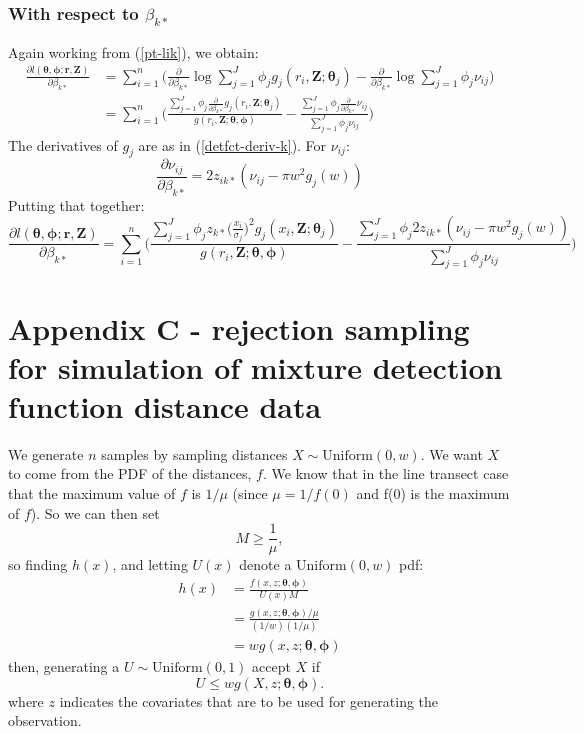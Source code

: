 \documentclass[useAMS,referee, usegraphicx]{biom}
\begin{document}
\subsubsection*{With respect to $\beta_{k*}$}

Again working from (\ref{pt-lik}), we obtain:
\begin{align*}
\frac{\partial l(\bm{\theta}, \bm{\phi}; \mathbf{r},\mathbf{Z})}{\partial \beta_{k*}}  &= \sum_{i=1}^n \Big( \frac{\partial}{\partial \beta_{k*}} \log \sum_{j=1}^J \phi_j g_j(r_i,\mathbf{Z}; \bm{\theta}_j) - \frac{\partial}{\partial \beta_{k*}}\log \sum_{j=1}^J \phi_j \nu_{ij}\Big)\\
&= \sum_{i=1}^n \Big( \frac{ \sum_{j=1}^J \phi_{j} \frac{\partial}{\partial \beta_{k*}}  g_{j} (r_i,\mathbf{Z}; \bm{\theta}_j)}{g(r_i,\mathbf{Z}; \bm{\theta}, \bm{\phi})} - \frac{ \sum_{j=1}^J \phi_{j}\frac{\partial}{\partial \beta_{k*}}  \nu_{ij} }{ \sum_{j=1}^J \phi_j \nu_{ij}}\Big)
\end{align*}
The derivatives of $g_j$ are as in (\ref{detfct-deriv-k}). For $\nu_{ij}$:
\begin{equation*}
\frac{\partial \nu_{ij}}{\partial \beta_{k*}} =  2z_{ik*}(\nu_{ij} - \pi w^2 g_j(w))
\end{equation*}
Putting that together:
\begin{equation*}
\frac{\partial l(\bm{\theta}, \bm{\phi}; \mathbf{r},\mathbf{Z})}{\partial \beta_{k*}}  = \sum_{i=1}^n \Big( \frac{ \sum_{j=1}^J \phi_{j} z_{k*} \Big( \frac{x_i}{\sigma_{j}}\Big)^2 g_j(x_i,\mathbf{Z}; \bm{\theta}_j)}{g(r_i,\mathbf{Z}; \bm{\theta}, \bm{\phi})} - \frac{ \sum_{j=1}^J \phi_{j}2z_{ik*}(\nu_{ij} - \pi w^2 g_j(w)) }{ \sum_{j=1}^J \phi_j \nu_{ij}}\Big)
\end{equation*}

\section*{Appendix C - rejection sampling for simulation of mixture detection function distance data}

We generate $n$ samples by sampling distances $X\sim \text{Uniform}(0,w)$. We want $X$ to come from the PDF of the distances, $f$. We know that in the line transect case that the maximum value of $f$ is $1/\mu$ (since $\mu=1/f(0)$ and f(0) is the maximum of $f$). So we can then set
\begin{equation*}
M \geq \frac{1}{\mu},
\end{equation*}
so finding $h(x)$, and letting $U(x)$ denote a $\text{Uniform}(0,w)$ pdf:
\begin{align*}
h(x) &= \frac{f(x,z; \bm{\theta}, \bm{\phi})}{U(x) M}\\
&= \frac{g(x,z; \bm{\theta}, \bm{\phi})/\mu}{(1/w) (1/\mu)}\\
&= w g(x,z; \bm{\theta}, \bm{\phi})
\end{align*}
then, generating a $U \sim \text{Uniform}(0,1)$ accept $X$ if 
\begin{equation*}
U \leq wg(X,z; \bm{\theta}, \bm{\phi}).
\end{equation*}
where $z$ indicates the covariates that are to be used for generating the observation.
\end{document}
